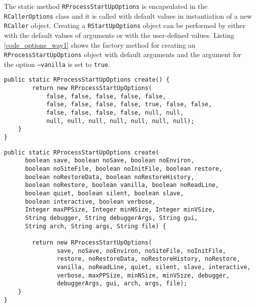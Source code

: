 \documentclass[10pt,a4paper, final, oneside]{article}
\begin{document}
The static method \texttt{RProcessStartUpOptions} is encapsulated in the \texttt{RCallerOptions} class and it is called with default values in instantiation of a new \texttt{RCaller} object. Creating a \texttt{RStartUpOptions} object can be performed by either with the default values of arguments or with the user-defined values. Listing \ref{code_options_way1} shows the factory method for creating an \texttt{RProcessStartUpOptions} object with default arguments and the argument for the option \texttt{--vanilla} is set to \texttt{true}. 

\begin{minipage}{\linewidth}
\begin{lstlisting}[caption=Default RProcessStartUpOptions Creator,label=code_options_way1]
 public static RProcessStartUpOptions create() {
        return new RProcessStartUpOptions(
            false, false, false, false, false,
            false, false, false, false, true, false, false,
            false, false, false, false, null, null,
            null, null, null, null, null, null, null);
    }
}
\end{lstlisting}
\end{minipage}


\begin{minipage}{\linewidth}
\begin{lstlisting}[caption=Custom RProcessStartUpOptions Creator,label=code_options_way2]
public static RProcessStartUpOptions create(
      boolean save, boolean noSave, boolean noEnviron,
      boolean noSiteFile, boolean noInitFile, boolean restore,
      boolean noRestoreData, boolean noRestoreHistory,
      boolean noRestore, boolean vanilla, boolean noReadLine,
      boolean quiet, boolean silent, boolean slave,
      boolean interactive, boolean verbose,
      Integer maxPPSize, Integer minNSize, Integer minVSize,
      String debugger, String debuggerArgs, String gui,
      String arch, String args, String file) {
            
        return new RProcessStartUpOptions(
               save, noSave, noEnviron, noSiteFile, noInitFile, 
               restore, noRestoreData, noRestoreHistory, noRestore, 
               vanilla, noReadLine, quiet, silent, slave, interactive, 
               verbose, maxPPSize, minNSize, minVSize, debugger, 
               debuggerArgs, gui, arch, args, file);
    }
}
\end{lstlisting}
\end{minipage}
\end{document}
